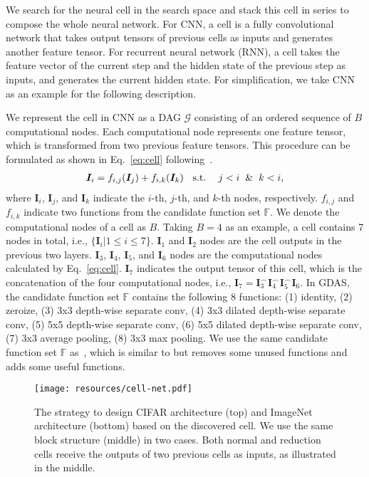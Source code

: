 \documentclass[10pt,twocolumn,letterpaper]{article}
\def\Eqref#1{Eq.~\eqref{#1}}
\def\mI{{\bm{I}}}
\def\gG{{\mathcal{G}}}
\def\sF{{\mathbb{F}}}
\begin{document}
We search for the neural cell in the search space and stack this cell in series to compose the whole neural network.
For CNN, a cell is a fully convolutional network that takes output tensors of previous cells as inputs and generates another feature tensor.
For recurrent neural network (RNN), a cell takes the feature vector of the current step and the hidden state of the previous step as inputs, and generates the current hidden state. For simplification, we take CNN as an example for the following description.

We represent the cell in CNN as a DAG $\gG$ consisting of an ordered sequence of $B$ computational nodes.
Each computational node represents one feature tensor, which is transformed from two previous feature tensors.
This procedure can be formulated as shown in \Eqref{eq:cell} following~\cite{Zoph_2018_CVPR}.
\begin{align}\label{eq:cell}
    \mI_{i} = f_{i,j}( \mI_{j} ) + f_{i,k}( \mI_{k} ) \hspace{2mm}~\mathrm{s.t.~}~\hspace{2mm}j<i\hspace{2mm}\&\hspace{2mm}k<i ,
\end{align}
where $\mI_{i}$, $\mI_{j}$, and $\mI_{k}$ indicate the $i$-th, $j$-th, and $k$-th nodes, respectively. $f_{i,j}$ and $f_{i,k}$ indicate two functions from the candidate function set $\sF$.
We denote the computational nodes of a cell as $B$.
Taking $B=4$ as an example, a cell contains 7 nodes in total, i.e., $\{\mI_{i} | 1 \leq i \leq 7\}$.
$\mI_{1}$ and $\mI_{2}$ nodes are the cell outputs in the previous two layers.
$\mI_{3}$, $\mI_{4}$, $\mI_{5}$, and $\mI_{6}$ nodes are the computational nodes calculated by \Eqref{eq:cell}.
$\mI_{7}$ indicates the output tensor of this cell, which is the concatenation of the four computational nodes, i.e., $\mI_{7} = \mI_{3}^\frown\mI_{4}^\frown\mI_{5}^\frown\mI_{6}$.
In GDAS, the candidate function set $\sF$ contains the following 8 functions:
(1) identity, (2) zeroize, (3) 3x3 depth-wise separate conv, (4) 3x3 dilated depth-wise separate conv, (5) 5x5 depth-wise separate conv, (6) 5x5 dilated depth-wise separate conv, (7) 3x3 average pooling, (8) 3x3 max pooling.
We use the same candidate function set $\sF$ as~\cite{liu2019darts}, which is similar to \cite{Zoph_2018_CVPR} but removes some unused functions and adds some useful functions.



\begin{figure}[t!]
\begin{center}
\texttt{[image: resources/cell-net.pdf]}
\end{center}
\caption[Captioning]{
The strategy to design CIFAR architecture (top) and ImageNet architecture (bottom) based on the discovered cell.
We use the same block structure (middle) in two cases.
Both normal and reduction cells receive the outputs of two previous cells as inputs, as illustrated in the middle.
}
\label{fig:cell2net}
\end{figure}
\end{document}

